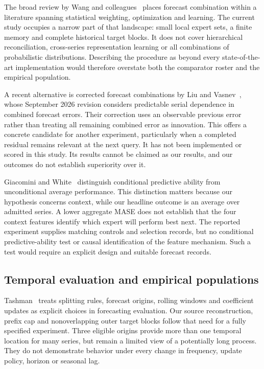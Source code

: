 The broad review by Wang and colleagues~\cite{wangreview} places forecast combination within a literature spanning statistical weighting, optimization and learning. The current study occupies a narrow part of that landscape: small local expert sets, a finite memory and complete historical target blocks. It does not cover hierarchical reconciliation, cross-series representation learning or all combinations of probabilistic distributions. Describing the procedure as beyond every state-of-the-art implementation would therefore overstate both the comparator roster and the empirical population.

A recent alternative is corrected forecast combinations by Liu and Vasnev~\cite{corrected}, whose September 2026 revision considers predictable serial dependence in combined forecast errors. Their correction uses an observable previous error rather than treating all remaining combined error as innovation. This offers a concrete candidate for another experiment, particularly when a completed residual remains relevant at the next query. It has not been implemented or scored in this study. Its results cannot be claimed as our results, and our outcomes do not establish superiority over it.

Giacomini and White~\cite{giacomini} distinguish conditional predictive ability from unconditional average performance. This distinction matters because our hypothesis concerns context, while our headline outcome is an average over admitted series. A lower aggregate MASE does not establish that the four context features identify which expert will perform best next. The reported experiment supplies matching controls and selection records, but no conditional predictive-ability test or causal identification of the feature mechanism. Such a test would require an explicit design and suitable forecast records.

\subsection{Temporal evaluation and empirical populations}
Tashman~\cite{tashman} treats splitting rules, forecast origins, rolling windows and coefficient updates as explicit choices in forecasting evaluation. Our source reconstruction, prefix cap and nonoverlapping outer target blocks follow that need for a fully specified experiment. Three eligible origins provide more than one temporal location for many series, but remain a limited view of a potentially long process. They do not demonstrate behavior under every change in frequency, update policy, horizon or seasonal lag.


